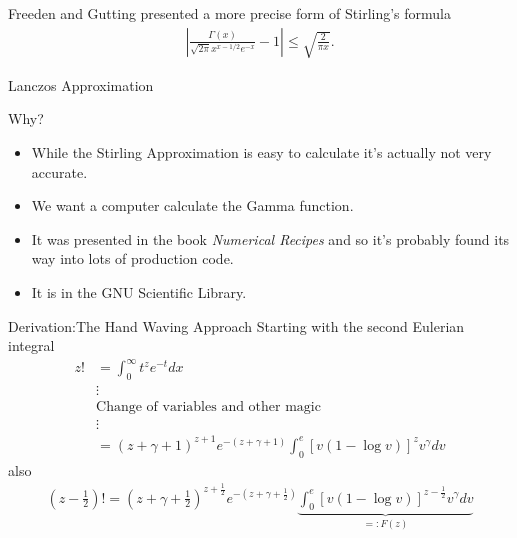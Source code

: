 \documentclass[pdf]{beamer}
\begin{document}
\begin{frame}
    Freeden and Gutting presented a more precise form of Stirling's formula
    \begin{align*}
       \left| \frac{\Gamma(x)}{\sqrt{2\pi} x^{x-1/2}e^{-x}} - 1\right| \leq \sqrt{\frac{2}{\pi x}}.
    \end{align*}
\end{frame}

\begin{frame}{Lanczos Approximation}
    \begin{block}{Why?}
        \begin{itemize}
            \item While the Stirling Approximation is easy to calculate it's actually not very accurate.
            \item We want a computer calculate the Gamma function.
            \item It was presented in the book \emph{Numerical Recipes} and so it's probably found its way into lots of production code.
            \item It is in the GNU Scientific Library.
        \end{itemize}
    \end{block}
\end{frame}
\begin{frame}{Derivation:The Hand Waving Approach}
Starting with the second Eulerian integral
\begin{align*}
    z!  &= \int_0^\infty t^{z}e^{-t} dx \\
        & \vdots \\
        & \text{Change of variables and other magic} \\
        & \vdots \\
        &= (z + \gamma + 1)^{z+1}e^{-(z + \gamma + 1)} \int_0^e \left[v(1-\log v) \right]^z v^\gamma dv
\end{align*}
also
\begin{align*}
    (z-\frac{1}{2})! = (z + \gamma + \frac{1}{2})^{z + \frac{1}{2}}e^{-(z + \gamma + \frac{1}{2})} \underbrace{\int_0^e \left[ v(1 - \log v )\right]^{z - \frac{1}{2}} v^\gamma dv}_{=: F(z)}
\end{align*}

\end{frame}
\end{document}
